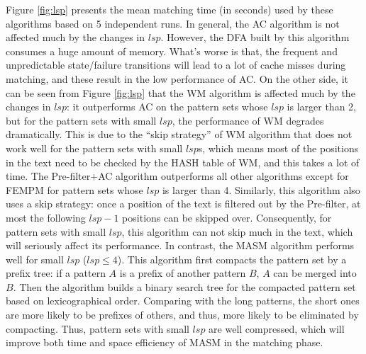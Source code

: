 \documentclass{article}
\begin{document}
Figure \ref{fig:lsp} presents the mean matching time (in seconds) used
by these algorithms based on 5 independent runs. In general, the
\textsf{AC} algorithm is not affected much by the changes in
$lsp$. However, the DFA built by this algorithm consumes a huge amount
of memory. What's worse is that, the frequent and unpredictable
state/failure transitions will lead to a lot of cache misses during
matching, and these result in the low performance of \textsf{AC}. On
the other side, it can be seen from Figure \ref{fig:lsp} that the
\textsf{WM} algorithm is affected much by the changes in $lsp$: it
outperforms \textsf{AC} on the pattern sets whose $lsp$ is larger than
2, but for the pattern sets with small $lsp$, the performance of
\textsf{WM} degrades dramatically. This is due to the ``skip
strategy'' of \textsf{WM} algorithm that does not work well for the
pattern sets with small $lsp$s, which means most of the positions in
the text need to be checked by the HASH table of \textsf{WM}, and this
takes a lot of time. The \textsf{Pre-filter+AC} algorithm outperforms
all other algorithms except for \textsf{FEMPM} for pattern sets whose
$lsp$ is larger than 4. Similarly, this algorithm also uses a skip
strategy: once a position of the text is filtered out by the
Pre-filter, at most the following $lsp-1$ positions can be skipped
over. Consequently, for pattern sets with small $lsp$, this algorithm
can not skip much in the text, which will seriously affect its
performance. In contrast, the \textsf{MASM} algorithm performs well
for small $lsp$ ($lsp \leq 4$). This algorithm first compacts the
pattern set by a prefix tree: if a pattern $A$ is a prefix of another
pattern $B$, $A$ can be merged into $B$. Then the algorithm builds a
binary search tree for the compacted pattern set based on
lexicographical order. Comparing with the long patterns, the short
ones are more likely to be prefixes of others, and thus, more likely
to be eliminated by compacting. Thus, pattern sets with small $lsp$
are well compressed, which will improve both time and space efficiency
of \textsf{MASM} in the matching phase.
\end{document}
